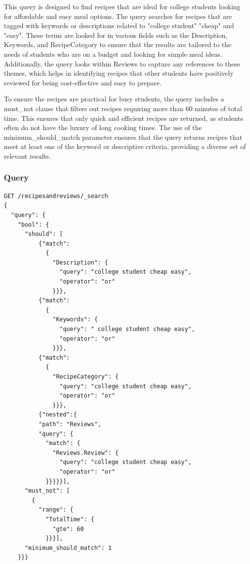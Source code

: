 \begin{enumerate}
    This query is designed to find recipes that are ideal for college students looking for affordable and easy meal options. The query searches for recipes that are tagged with keywords or descriptions related to "college student" "cheap" and "easy". These terms are looked for in various fields such as the Description, Keywords, and RecipeCategory to ensure that the results are tailored to the needs of students who are on a budget and looking for simple meal ideas. Additionally, the query looks within Reviews to capture any references to these themes, which helps in identifying recipes that other students have positively reviewed for being cost-effective and easy to prepare.

    To ensure the recipes are practical for busy students, the query includes a must\_not clause that filters out recipes requiring more than 60 minutes of total time. This ensures that only quick and efficient recipes are returned, as students often do not have the luxury of long cooking times. The use of the minimum\_should\_match parameter ensures that the query returns recipes that meet at least one of the keyword or descriptive criteria, providing a diverse set of relevant results.

    \subsubsection{Query}
    \begin{lstlisting}[language=Elasticsearch]
GET /recipesandreviews/_search
{
  "query": {
    "bool": {
      "should": [
          {"match":
            {
              "Description": {
                "query": "college student cheap easy",
                "operator": "or"
              }}},
          {"match":
            {
              "Keywords": {
                "query": " college student cheap easy",
                "operator": "or"
              }}},
          {"match":
            {
              "RecipeCategory": {
                "query": "college student cheap easy",
                "operator": "or"
              }}},
          {"nested":{
          "path": "Reviews",
          "query": {
            "match": {
              "Reviews.Review": {
                "query": "college student cheap easy",
                "operator": "or"
            }}}}}],
      "must_not": [
        {
          "range": {
            "TotalTime": {
              "gte": 60
            }}}],
      "minimum_should_match": 1
    }}}
    \end{lstlisting}


\end{enumerate}
